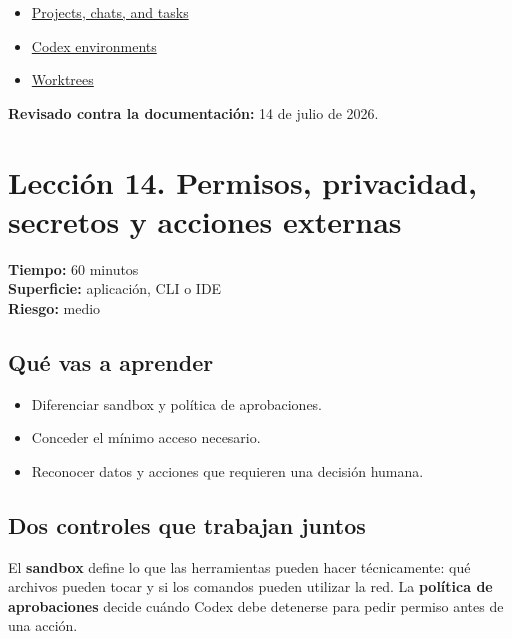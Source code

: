 \documentclass[10pt,a4paper,openany]{book}
\providecommand{\tightlist}{\setlength{\itemsep}{0.18em}\setlength{\parskip}{0pt}}
\begin{document}
\begin{itemize}
\tightlist
\item
  \href{https://learn.chatgpt.com/docs/projects}{Projects, chats, and
  tasks}
\item
  \href{https://learn.chatgpt.com/docs/environments/modes}{Codex
  environments}
\item
  \href{https://learn.chatgpt.com/docs/environments/git-worktrees}{Worktrees}
\end{itemize}

\textbf{Revisado contra la documentación:} 14 de julio de 2026.

\clearpage

\section{Lección 14. Permisos, privacidad, secretos y acciones
externas}\label{lecciuxf3n-14.-permisos-privacidad-secretos-y-acciones-externas}

\begin{metabox}

\textbf{Tiempo:} 60 minutos\\
\textbf{Superficie:} aplicación, CLI o IDE\\
\textbf{Riesgo:} medio

\end{metabox}

\subsection{Qué vas a aprender}\label{quuxe9-vas-a-aprender-13}

\begin{itemize}
\tightlist
\item
  Diferenciar sandbox y política de aprobaciones.
\item
  Conceder el mínimo acceso necesario.
\item
  Reconocer datos y acciones que requieren una decisión humana.
\end{itemize}

\subsection{Dos controles que trabajan
juntos}\label{dos-controles-que-trabajan-juntos}

El \textbf{sandbox} define lo que las herramientas pueden hacer
técnicamente: qué archivos pueden tocar y si los comandos pueden
utilizar la red. La \textbf{política de aprobaciones} decide cuándo
Codex debe detenerse para pedir permiso antes de una acción.
\end{document}
